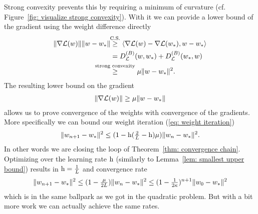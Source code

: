 Strong convexity prevents this by requiring a minimum of curvature (cf.
Figure~\ref{fig: visualize strong convexity}). With it we can provide a lower
bound of the gradient using the weight difference directly
\begin{align}
	\nonumber
	\|\nabla\Loss(\weights)\|\|\weights -\minimum\|
	&\lxge{\text{C.S.}} \langle \nabla\Loss(\weights) -\nabla\Loss(\minimum), \weights - \minimum \rangle\\
	\nonumber
	&= \bregmanDiv{\Loss}(\weights, \minimum) + \bregmanDiv{\Loss}(\minimum, \weights)\\
	\label{eq: strong convexity implies PL}
	&\lxge{\text{strong convexity}} \lbound \|\weights-\minimum\|^2.
\end{align}
The resulting lower bound on the gradient 
\begin{align*}
	\|\nabla\mathcal{L}(w)\|\ge \mu\|w -w_*\|
\end{align*}
allows us to prove convergence of the weights with convergence of the gradients.
More specifically we can bound our weight iteration (\ref{eq: weight iteration})
\begin{align*}
	\|w_{n+1}-w_*\|^2
	\le (1-\text{h}(\tfrac2{L} -\text{h})\mu)\|w_n - w_*\|^2.
\end{align*}
In other words we are closing the loop of Theorem~\ref{thm: convergence chain}.
Optimizing over the learning rate \(\text{h}\) (similarly to Lemma~\ref{lem: smallest
upper bound}) results in \(\text{h}=\tfrac1{L}\) and convergence rate
\begin{align*}
	\|w_{n+1}-w_*\|^2
	\le (1-\tfrac{\mu}{2L})\|w_n - w_*\|^2
	\le (1-\tfrac{1}{2\kappa})^{n+1}\|w_0-w_*\|^2
\end{align*}
%
which is in the same ballpark as we got in the quadratic problem. But with a bit
more work we can actually achieve the same rates.
%
